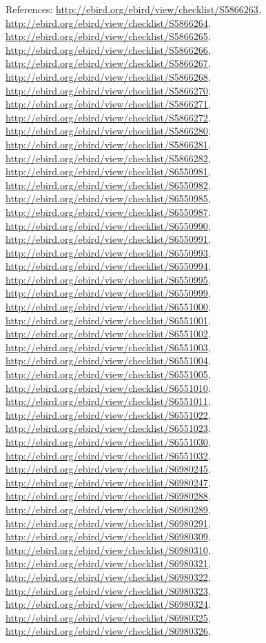 \documentclass[9pt, article]{memoir}
\begin{document}
\begin{multicols}{2}
\vspace{6pt}References: 
\url{http://ebird.org/ebird/view/checklist/S5866263}, 
\url{http://ebird.org/ebird/view/checklist/S5866264}, 
\url{http://ebird.org/ebird/view/checklist/S5866265}, 
\url{http://ebird.org/ebird/view/checklist/S5866266}, 
\url{http://ebird.org/ebird/view/checklist/S5866267}, 
\url{http://ebird.org/ebird/view/checklist/S5866268}, 
\url{http://ebird.org/ebird/view/checklist/S5866270}, 
\url{http://ebird.org/ebird/view/checklist/S5866271}, 
\url{http://ebird.org/ebird/view/checklist/S5866272}, 
\url{http://ebird.org/ebird/view/checklist/S5866280}, 
\url{http://ebird.org/ebird/view/checklist/S5866281}, 
\url{http://ebird.org/ebird/view/checklist/S5866282}, 
\url{http://ebird.org/ebird/view/checklist/S6550981}, 
\url{http://ebird.org/ebird/view/checklist/S6550982}, 
\url{http://ebird.org/ebird/view/checklist/S6550985}, 
\url{http://ebird.org/ebird/view/checklist/S6550987}, 
\url{http://ebird.org/ebird/view/checklist/S6550990}, 
\url{http://ebird.org/ebird/view/checklist/S6550991}, 
\url{http://ebird.org/ebird/view/checklist/S6550993}, 
\url{http://ebird.org/ebird/view/checklist/S6550994}, 
\url{http://ebird.org/ebird/view/checklist/S6550995}, 
\url{http://ebird.org/ebird/view/checklist/S6550999}, 
\url{http://ebird.org/ebird/view/checklist/S6551000}, 
\url{http://ebird.org/ebird/view/checklist/S6551001}, 
\url{http://ebird.org/ebird/view/checklist/S6551002}, 
\url{http://ebird.org/ebird/view/checklist/S6551003}, 
\url{http://ebird.org/ebird/view/checklist/S6551004}, 
\url{http://ebird.org/ebird/view/checklist/S6551005}, 
\url{http://ebird.org/ebird/view/checklist/S6551010}, 
\url{http://ebird.org/ebird/view/checklist/S6551011}, 
\url{http://ebird.org/ebird/view/checklist/S6551022}, 
\url{http://ebird.org/ebird/view/checklist/S6551023}, 
\url{http://ebird.org/ebird/view/checklist/S6551030}, 
\url{http://ebird.org/ebird/view/checklist/S6551032}, 
\url{http://ebird.org/ebird/view/checklist/S6980245}, 
\url{http://ebird.org/ebird/view/checklist/S6980247}, 
\url{http://ebird.org/ebird/view/checklist/S6980288}, 
\url{http://ebird.org/ebird/view/checklist/S6980289}, 
\url{http://ebird.org/ebird/view/checklist/S6980291}, 
\url{http://ebird.org/ebird/view/checklist/S6980309}, 
\url{http://ebird.org/ebird/view/checklist/S6980310}, 
\url{http://ebird.org/ebird/view/checklist/S6980321}, 
\url{http://ebird.org/ebird/view/checklist/S6980322}, 
\url{http://ebird.org/ebird/view/checklist/S6980323}, 
\url{http://ebird.org/ebird/view/checklist/S6980324}, 
\url{http://ebird.org/ebird/view/checklist/S6980325}, 
\url{http://ebird.org/ebird/view/checklist/S6980326}, 

\end{multicols}
\end{document}
